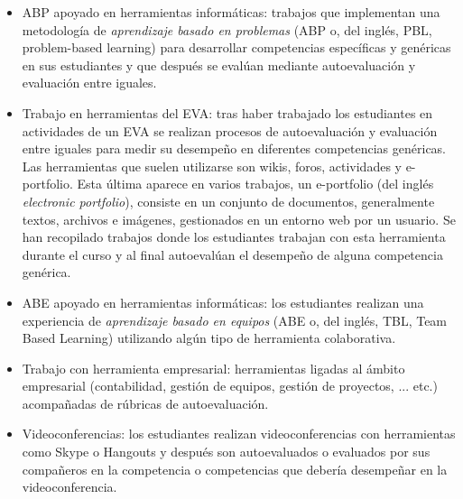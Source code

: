 \begin{itemize}
\item ABP apoyado en herramientas informáticas: trabajos que implementan una metodología de \emph{aprendizaje basado en problemas} (ABP o, del inglés, PBL, problem-based learning) para desarrollar competencias específicas y genéricas en sus estudiantes y que después se evalúan mediante autoevaluación y evaluación entre iguales.
\item Trabajo en herramientas del EVA:  tras haber trabajado los estudiantes en actividades de un EVA se realizan procesos de autoevaluación y evaluación entre iguales para medir su desempeño en diferentes competencias genéricas. Las herramientas que suelen utilizarse son wikis, foros, actividades y e-portfolio. Esta última aparece en varios trabajos, un e-portfolio (del inglés \emph{electronic portfolio}), consiste en un conjunto de documentos, generalmente textos, archivos e imágenes, gestionados en un entorno web por un usuario. Se han recopilado trabajos donde los estudiantes trabajan con esta herramienta durante el curso y al final autoevalúan el desempeño de alguna competencia genérica.
\item ABE apoyado en herramientas informáticas: los estudiantes realizan una experiencia de \emph{aprendizaje basado en equipos} (ABE o, del inglés, TBL, Team Based Learning) utilizando algún tipo de herramienta colaborativa.
\item Trabajo con herramienta empresarial: herramientas ligadas al ámbito empresarial (contabilidad, gestión de equipos, gestión de proyectos, ... etc.) acompañadas de rúbricas de autoevaluación.
\item Videoconferencias: los estudiantes realizan videoconferencias con herramientas como Skype o Hangouts y después son autoevaluados o evaluados por sus compañeros en la competencia o competencias que debería desempeñar en la videoconferencia.
\end{itemize}

